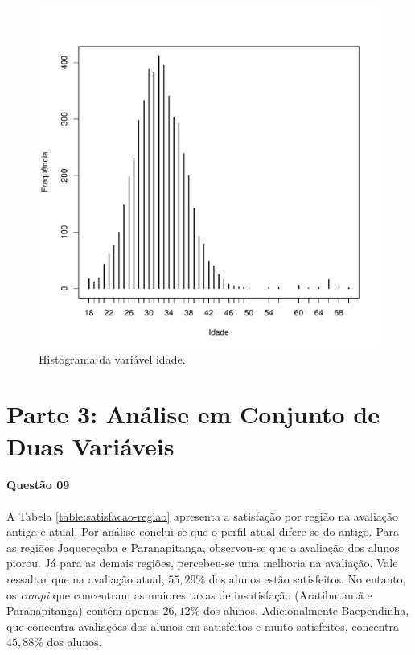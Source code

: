 \documentclass[10pt,a4paper,oneside]{article}
\newcommand{\arat}{Aratibutantã\xspace}
\newcommand{\baep}{Baependinha\xspace}
\newcommand{\jaqu}{Jaquereçaba\xspace}
\newcommand{\para}{Paranapitanga\xspace}
\begin{document}
\begin{figure}[h]
\begin{minipage}{0.46\textwidth}
	\includegraphics[width=\linewidth]{plots/histograma-idade}
	\caption{Histograma da variável idade. }
	\label{figure: histograma idade}
\end{minipage}
\end{figure}

\section*{Parte 3: Análise em Conjunto de Duas Variáveis}

\paragraph{Questão 09}

A Tabela \ref{table:satisfacao-regiao} apresenta a satisfação por região na avaliação antiga e atual. Por análise conclui-se que o perfil atual difere-se do antigo. Para as regiões \jaqu e \para, observou-se que a avaliação dos alunos piorou. Já para as demais regiões, percebeu-se uma melhoria na avaliação. Vale ressaltar que na avaliação atual, $55,29\%$ dos alunos estão satisfeitos. No entanto, os \textit{campi} que concentram as maiores taxas de insatisfação (\arat e \para) contém apenas $26,12\%$ dos alunos. Adicionalmente \baep, que concentra avaliações dos alunos em satisfeitos e muito satisfeitos, concentra $45,88\%$ dos alunos.
\end{document}
